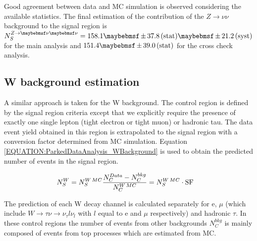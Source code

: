 Good agreement between data and \gls{MC} simulation is observed considering the available statistics. The final estimation of the contribution of the $Z\rightarrow \nu\nu$ background to the signal region is $N_{S}^{Z\rightarrow\nu\nu}= 158.1 \pm 37.8 \stat \pm 21.2 \syst$ for the main analysis and $151.4 \pm 39.0 \stat$ for the cross check analysis. 

\subsection{W background estimation}
\label{SECTION:ParkedDataAnalysis_ControlRegions_WBackground}


A similar approach is taken for the W background. The control region is defined by the signal region criteria except that we explicitly require the presence of exactly one single lepton (tight electron or tight muon) or hadronic tau. The data event yield obtained in this region is extrapolated to the signal region with a conversion factor determined from \gls{MC} simulation. Equation \ref{EQUATION:ParkedDataAnalysis_WBackground} is used to obtain the predicted number of events in the signal region.

\begin{align}
N_{S}^{W}&=N_{S}^{W\,MC}\frac{N_{C}^{Data}-N_{C}^{bkg}}{N_{C}^{W\,MC}}=N_{S}^{W\,MC}\cdot \rm{SF}
\label{EQUATION:ParkedDataAnalysis_WBackground}
\end{align}

The prediction of each W decay channel is calculated separately for e, $\mu$ (which include $W\rightarrow\tau\nu\rightarrow \nu_\tau l\nu_l$ with $l$ equal to e and $\mu$ respectively) and hadronic $\tau$. In these control regions the number of events from other backgrounds $N_{C}^{bkg}$ is mainly composed of events from top processes which are estimated from \gls{MC}.

